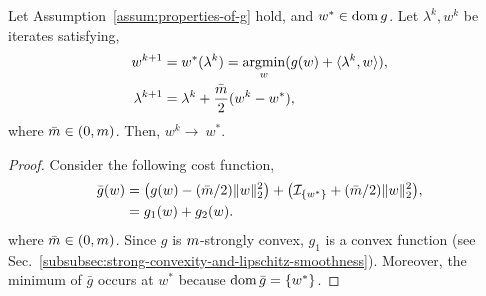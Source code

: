 \begin{lemma}
\label{lem:iterative-method-consensus-admm}
Let Assumption~\ref{assum:properties-of-g} hold, and $w^* \in \operatorname{dom}{g}$.
Let $\lambda^k, w^k$ be iterates satisfying,
\begin{subequations}
\label{eq:iterative-method-consensus-admm}
\begin{align}
    w^{k+1} & = w^*(\lambda^k) = \operatorname*{argmin}_{w} ( g(w) + \langle\lambda^k, w \rangle ), \\
    \lambda^{k+1} & = \lambda^k + \frac{\bar{m}}{2} (w^{k} - w^*),
\end{align}
\end{subequations}
where $\bar{m} \in (0, m)$.
Then, $w^k \rightarrow \ w^*$.
\end{lemma}

\begin{proof}
Consider the following cost function,
\begin{equation*}
\begin{split}
    \bar{g}(w) & = \bigl(g(w) - (\bar{m}/2) \lVert w\rVert_2^2 \bigr) + \bigl( \mathcal{I}_{ \{ w^*\}} + (\bar{m}/2) \lVert w \rVert^2_2 \bigr), \\
    & = g_1(w) + g_2(w).
\end{split}
\end{equation*}
where $\bar{m} \in (0, m)$.
Since $g$ is $m$-strongly convex, $g_1$ is a convex function (see Sec.~\ref{subsubsec:strong-convexity-and-lipschitz-smoothness}).
Moreover, the minimum of $\bar{g}$ occurs at $w^*$ because $\operatorname{dom}{\bar{g}} = \{w^*\}$.


\end{proof}
